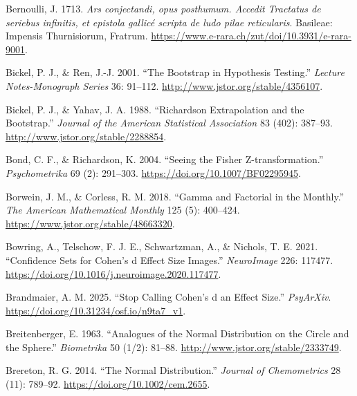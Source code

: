 \documentclass[
]{article}
\newlength{\cslhangindent}
\newlength{\cslentryspacingunit} %
\newenvironment{CSLReferences}[2] %
 {%
  \setlength{\parindent}{0pt}
  \ifodd #1
  \let\oldpar\par
  \def\par{\hangindent=\cslhangindent\oldpar}
  \fi
  \setlength{\parskip}{#2\cslentryspacingunit}
 }%
 {}
\begin{document}
\begin{CSLReferences}{1}{0}
\leavevmode{}%
Bernoulli, J. 1713. \emph{{Ars conjectandi, opus posthumum. Accedit
Tractatus de seriebus infinitis, et epistola gallicé scripta de ludo
pilae reticularis}}. Basileae: Impensis Thurnisiorum, Fratrum.
\url{https://www.e-rara.ch/zut/doi/10.3931/e-rara-9001}.

\leavevmode{}%
Bickel, P. J., \& Ren, J.-J. 2001. {``The Bootstrap in Hypothesis
Testing.''} \emph{Lecture Notes-Monograph Series} 36: 91--112.
\url{http://www.jstor.org/stable/4356107}.

\leavevmode{}%
Bickel, P. J., \& Yahav, J. A. 1988. {``Richardson Extrapolation and the
Bootstrap.''} \emph{Journal of the American Statistical Association} 83
(402): 387--93. \url{http://www.jstor.org/stable/2288854}.

\leavevmode{}%
Bond, C. F., \& Richardson, K. 2004. {``{Seeing the Fisher
Z-transformation}.''} \emph{Psychometrika} 69 (2): 291--303.
\url{https://doi.org/10.1007/BF02295945}.

\leavevmode{}%
Borwein, J. M., \& Corless, R. M. 2018. {``Gamma and Factorial in the
Monthly.''} \emph{The American Mathematical Monthly} 125 (5): 400--424.
\url{https://www.jstor.org/stable/48663320}.

\leavevmode{}%
Bowring, A., Telschow, F. J. E., Schwartzman, A., \& Nichols, T. E.
2021. {``Confidence Sets for Cohen's d Effect Size Images.''}
\emph{NeuroImage} 226: 117477.
\url{https://doi.org/10.1016/j.neuroimage.2020.117477}.

\leavevmode{}%
Brandmaier, A. M. 2025. {``Stop Calling Cohen's d an Effect Size.''}
\emph{PsyArXiv}. \url{https://doi.org/10.31234/osf.io/n9ta7_v1}.

\leavevmode{}%
Breitenberger, E. 1963. {``Analogues of the Normal Distribution on the
Circle and the Sphere.''} \emph{Biometrika} 50 (1/2): 81--88.
\url{http://www.jstor.org/stable/2333749}.

\leavevmode{}%
Brereton, R. G. 2014. {``The Normal Distribution.''} \emph{Journal of
Chemometrics} 28 (11): 789--92. \url{https://doi.org/10.1002/cem.2655}.


\end{CSLReferences}
\end{document}
